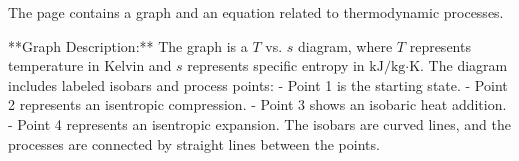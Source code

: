 The page contains a graph and an equation related to thermodynamic processes.  

**Graph Description:**  
The graph is a \( T \) vs. \( s \) diagram, where \( T \) represents temperature in Kelvin and \( s \) represents specific entropy in \( \text{kJ/kg·K} \). The diagram includes labeled isobars and process points:  
- Point 1 is the starting state.  
- Point 2 represents an isentropic compression.  
- Point 3 shows an isobaric heat addition.  
- Point 4 represents an isentropic expansion.  
The isobars are curved lines, and the processes are connected by straight lines between the points.